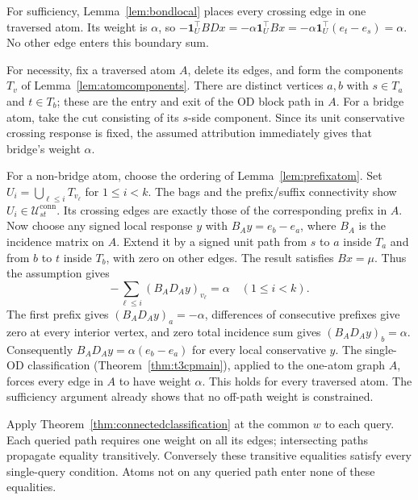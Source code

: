\begin{pf}
For sufficiency, Lemma~\ref{lem:bondlocal} places every crossing edge
in one traversed atom. Its weight is $\alpha$, so
$-\mathbf1_U^\top BDx=-\alpha\mathbf1_U^\top Bx
=-\alpha\mathbf1_U^\top(e_t-e_s)=\alpha$.
No other edge enters this boundary sum.

For necessity, fix a traversed atom $A$, delete its edges, and form
the components $T_v$ of Lemma~\ref{lem:atomcomponents}. There are
distinct vertices $a,b$ with $s\in T_a$ and $t\in T_b$; these are the
entry and exit of the OD block path in $A$.
For a bridge atom, take the cut consisting of its $s$-side component.
Since its unit conservative crossing response is fixed, the assumed
attribution immediately gives that bridge's weight $\alpha$.

For a non-bridge atom, choose the ordering of
Lemma~\ref{lem:prefixatom}. Set
$U_i=\bigcup_{\ell\le i}T_{v_\ell}$ for $1\le i<k$.
The bags and the prefix/suffix connectivity show
$U_i\in\mathcal U^{\mathrm{conn}}_{st}$. Its crossing edges are exactly
those of the corresponding prefix in $A$.
Now choose any signed local response $y$ with
$B_Ay=e_b-e_a$, where $B_A$ is the incidence matrix on $A$.
Extend it by a signed unit path from $s$ to $a$ inside $T_a$ and from
$b$ to $t$ inside $T_b$, with zero on other edges. The result satisfies
$Bx=\mu$. Thus the assumption gives
\[
-\sum_{\ell\le i}(B_AD_Ay)_{v_\ell}=\alpha
\quad(1\le i<k).
\]
The first prefix gives $(B_AD_Ay)_a=-\alpha$, differences of consecutive
prefixes give zero at every interior vertex, and zero total incidence
sum gives $(B_AD_Ay)_b=\alpha$. Consequently
$B_AD_Ay=\alpha(e_b-e_a)$ for every local conservative $y$.
The single-OD classification (Theorem~\ref{thm:t3cpmain}), applied to the
one-atom graph $A$, forces every edge in $A$ to have weight $\alpha$.
This holds for every traversed atom. The sufficiency argument already
shows that no off-path weight is constrained.
\end{pf}

\begin{pf}
Apply Theorem~\ref{thm:connectedclassification} at the common $w$ to
each query. Each queried path requires one weight on all its edges;
intersecting paths propagate equality transitively. Conversely these
transitive equalities satisfy every single-query condition. Atoms not
on any queried path enter none of these equalities.
\end{pf}

